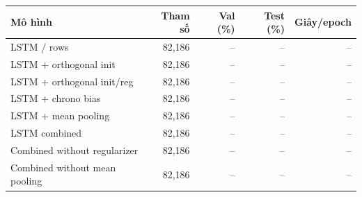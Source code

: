 \begin{tabularx}{\textwidth}{@{}Xrrrr@{}}
\toprule
Mô hình & Tham số & Val (\%) & Test (\%) & Giây/epoch \\
\midrule
LSTM / rows & 82,186 & -- & -- & -- \\
LSTM + orthogonal init & 82,186 & -- & -- & -- \\
LSTM + orthogonal init/reg & 82,186 & -- & -- & -- \\
LSTM + chrono bias & 82,186 & -- & -- & -- \\
LSTM + mean pooling & 82,186 & -- & -- & -- \\
LSTM combined & 82,186 & -- & -- & -- \\
Combined without regularizer & 82,186 & -- & -- & -- \\
Combined without mean pooling & 82,186 & -- & -- & -- \\
\bottomrule
\end{tabularx}
